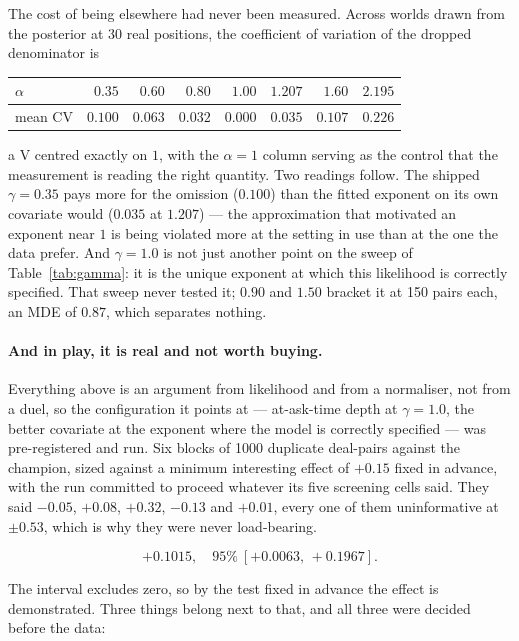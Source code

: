 \documentclass[11pt,a4paper]{article}
\begin{document}
The cost of being elsewhere had never been measured. Across worlds drawn from
the posterior at 30 real positions, the coefficient of variation of the dropped
denominator is

\begin{center}
\small
\begin{tabular}{lrrrrrrr}
\toprule
$\alpha$ & $0.35$ & $0.60$ & $0.80$ & $1.00$ & $1.207$ & $1.60$ & $2.195$ \\
\midrule
mean CV & $0.100$ & $0.063$ & $0.032$ & $\mathbf{0.000}$ & $0.035$ & $0.107$ & $0.226$ \\
\bottomrule
\end{tabular}
\end{center}

a V centred exactly on $1$, with the $\alpha = 1$ column serving as the control
that the measurement is reading the right quantity. Two readings follow. The
shipped $\gamma = 0.35$ pays more for the omission ($0.100$) than the fitted
exponent on its own covariate would ($0.035$ at $1.207$) --- the approximation
that motivated an exponent near $1$ is being violated more at the setting in use
than at the one the data prefer. And $\gamma = 1.0$ is not just another point on
the sweep of Table~\ref{tab:gamma}: it is the unique exponent at which this
likelihood is correctly specified. That sweep never tested it; $0.90$ and $1.50$
bracket it at 150 pairs each, an MDE of $0.87$, which separates nothing.

\paragraph{And in play, it is real and not worth buying.}
\label{sec:res-atask} Everything above is an
argument from likelihood and from a normaliser, not from a duel, so the
configuration it points at --- at-ask-time depth at $\gamma = 1.0$, the better
covariate at the exponent where the model is correctly specified --- was
pre-registered and run. Six blocks of 1000 duplicate deal-pairs against the
champion, sized against a minimum interesting effect of $+0.15$ fixed in
advance, with the run committed to proceed whatever its five screening cells
said. They said $-0.05$, $+0.08$, $+0.32$, $-0.13$ and $+0.01$, every one of
them uninformative at $\pm 0.53$, which is why they were never load-bearing.

\[
  +0.1015, \quad 95\%\ [+0.0063,\, +0.1967].
\]

The interval excludes zero, so by the test fixed in advance the effect is
demonstrated. Three things belong next to that, and all three were decided
before the data:
\end{document}
